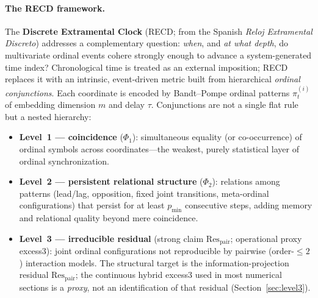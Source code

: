 \documentclass[11pt,a4paper]{article}
\begin{document}
\paragraph{The RECD framework.}
The \textbf{Discrete Extramental Clock} (RECD; from the Spanish
\emph{Reloj Extramental Discreto}) addresses a complementary question:
\emph{when}, and \emph{at what depth}, do multivariate ordinal events
cohere strongly enough to advance a system-generated time index?
Chronological time is treated as an external imposition; RECD replaces it
with an intrinsic, event-driven metric built from hierarchical
\emph{ordinal conjunctions}. Each coordinate is encoded by Bandt--Pompe
ordinal patterns $\pi^{(i)}_t$ of embedding dimension $m$ and delay
$\tau$. Conjunctions are not a single flat rule but a nested hierarchy:

\begin{itemize}[leftmargin=*,itemsep=2pt]
  \item \textbf{Level~1 --- coincidence} ($\Phi_1$): simultaneous
  equality (or co-occurrence) of ordinal symbols across coordinates---the
  weakest, purely statistical layer of ordinal synchronization.
  \item \textbf{Level~2 --- persistent relational structure} ($\Phi_2$):
  relations among patterns (lead/lag, opposition, fixed joint transitions,
  meta-ordinal configurations) that persist for at least $p_{\min}$
  consecutive steps, adding memory and relational quality beyond mere
  coincidence.
  \item \textbf{Level~3 --- irreducible residual} (strong claim
  $\mathrm{Res}_{\mathrm{pair}}$; operational proxy excess3):
  joint ordinal configurations not reproducible by pairwise
  (order-$\le 2$) interaction models. The structural target is the
  information-projection residual $\mathrm{Res}_{\mathrm{pair}}$; the
  continuous hybrid excess3 used in most numerical sections is a
  \emph{proxy}, not an identification of that residual
  (Section~\ref{sec:level3}).
\end{itemize}
\end{document}
